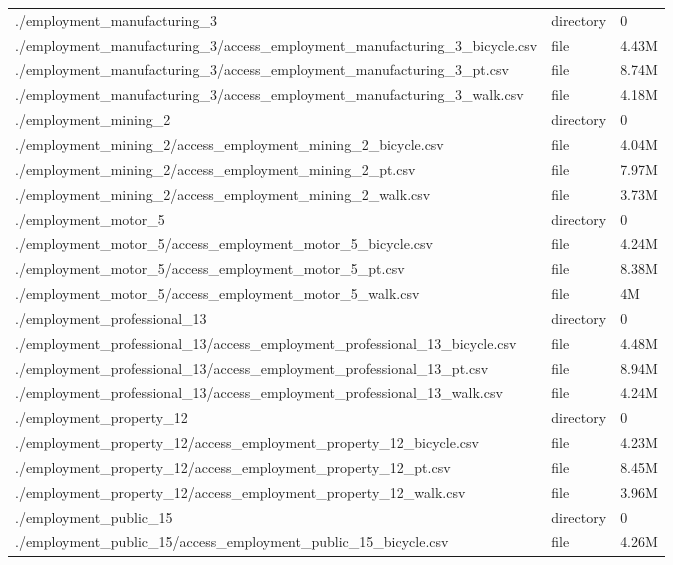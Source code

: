 \documentclass{article}
\begin{document}
\begin{longtable}[t]{>{\raggedright\arraybackslash}p{13cm}ll}
\addlinespace
./employment\_manufacturing\_3 & directory & 0\\
./employment\_manufacturing\_3/access\_employment\_manufacturing\_3\_bicycle.csv & file & 4.43M\\
./employment\_manufacturing\_3/access\_employment\_manufacturing\_3\_pt.csv & file & 8.74M\\
./employment\_manufacturing\_3/access\_employment\_manufacturing\_3\_walk.csv & file & 4.18M\\
./employment\_mining\_2 & directory & 0\\
\addlinespace
./employment\_mining\_2/access\_employment\_mining\_2\_bicycle.csv & file & 4.04M\\
./employment\_mining\_2/access\_employment\_mining\_2\_pt.csv & file & 7.97M\\
./employment\_mining\_2/access\_employment\_mining\_2\_walk.csv & file & 3.73M\\
./employment\_motor\_5 & directory & 0\\
./employment\_motor\_5/access\_employment\_motor\_5\_bicycle.csv & file & 4.24M\\
\addlinespace
./employment\_motor\_5/access\_employment\_motor\_5\_pt.csv & file & 8.38M\\
./employment\_motor\_5/access\_employment\_motor\_5\_walk.csv & file & 4M\\
./employment\_professional\_13 & directory & 0\\
./employment\_professional\_13/access\_employment\_professional\_13\_bicycle.csv & file & 4.48M\\
./employment\_professional\_13/access\_employment\_professional\_13\_pt.csv & file & 8.94M\\
\addlinespace
./employment\_professional\_13/access\_employment\_professional\_13\_walk.csv & file & 4.24M\\
./employment\_property\_12 & directory & 0\\
./employment\_property\_12/access\_employment\_property\_12\_bicycle.csv & file & 4.23M\\
./employment\_property\_12/access\_employment\_property\_12\_pt.csv & file & 8.45M\\
./employment\_property\_12/access\_employment\_property\_12\_walk.csv & file & 3.96M\\
\addlinespace
./employment\_public\_15 & directory & 0\\
./employment\_public\_15/access\_employment\_public\_15\_bicycle.csv & file & 4.26M\\

\end{longtable}
\end{document}
